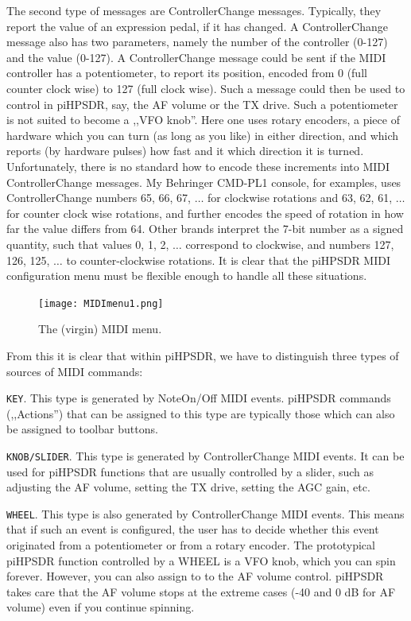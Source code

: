 \documentclass[12pt]{book}
\def\rett#1{\texttt{\color{red}#1}}
\def\pH{pi\-HPSDR\xspace}
\begin{document}
The second type of messages are ControllerChange messages. Typically, they report the value of
an expression pedal, if it has changed. A ControllerChange message also has two parameters,
namely the number of the controller (0-127) and the value (0-127). A ControllerChange
message could be sent if the MIDI controller has a potentiometer, to report its position,
encoded from 0 (full counter clock wise) to 127 (full clock wise). Such a message could then be
used to control in \pH, say, the AF volume or the TX drive. Such a potentiometer is
not suited to become a ,,VFO knob''. Here one uses rotary encoders, a piece of hardware which
you can turn (as long as you like) in either direction, and which reports (by hardware pulses)
how fast and it which direction it is turned. Unfortunately, there is no standard how to
encode these increments into MIDI ControllerChange messages. My Behringer CMD-PL1 console,
for examples, uses ControllerChange numbers 65, 66, 67, $\ldots$ for clockwise rotations
and 63, 62, 61, $\ldots$ for counter clock wise rotations, and further encodes the speed of
rotation in how far the value differs from 64. Other brands interpret the 7-bit number
as a signed quantity, such that values 0, 1, 2, $\ldots$ correspond to clockwise,
and numbers 127, 126, 125, $\ldots$ to counter-clockwise rotations. It is clear that
the \pH MIDI configuration menu must be flexible enough to handle all these situations.

\begin{figure}[ht]
\center
\texttt{[image: MIDImenu1.png]}
\caption{The (virgin) MIDI menu.}
\label{fig:MIDImenu1}
\end{figure}

From this it is clear that within \pH, we have to distinguish three types of sources
of MIDI commands:

\rett{KEY}. This type is generated by NoteOn/Off MIDI events. \pH commands (,,Actions'') that
can be assigned to this type are typically those which can also be assigned to toolbar
buttons.

\rett{KNOB/SLIDER}. This type is generated by ControllerChange MIDI events. It can be used
for \pH functions that are usually controlled by a slider, such as adjusting the AF
volume, setting the TX drive, setting the AGC gain, etc.

\rett{WHEEL}. This type is also generated by ControllerChange MIDI events. This means
that if such an event is configured, the user has to decide whether this event
originated from a potentiometer or from a rotary encoder. The prototypical \pH
function controlled by a WHEEL is a VFO knob, which you can spin forever. However,
you can also assign to to the AF volume control. \pH takes care that the
AF volume stops at the extreme cases (-40 and 0 dB for AF volume) even if you continue
spinning.
\end{document}
